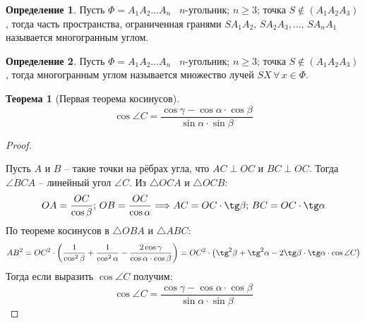 \documentclass[12pt]{article}
\theoremstyle{definition}
\newtheorem{theorem}{Теорема}[section]
\newtheorem{definition}{Определение}
\begin{document}
\begin{definition}
    Пусть $\Phi=A_1A_2\ldots A_n$ \textemdash\, $n$-угольник; $n\geq3$; точка $S\notin (A_1A_2A_3)$, тогда часть пространства, ограниченная гранями $SA_1A_2,\,SA_2A_3,\ldots,\,SA_nA_1$ называется многогранным углом. 
\end{definition}
\begin{definition}
    Пусть $\Phi=A_1A_2\ldots A_n$ \textemdash\, $n$-угольник; $n\geq3$; точка $S\notin (A_1A_2A_3)$, тогда многогранным углом называется множество лучей $SX\,\forall\,x\in\Phi$.
\end{definition}
\begin{theorem}[Первая теорема косинусов]
    $$\cos\angle C=\frac{\cos\gamma-\cos\alpha\cdot\cos\beta}{\sin\alpha\cdot\sin\beta}$$
\end{theorem}
\begin{proof}
    $ $\par\nobreak\ignorespaces
    \begin{center}
    \end{center}
    Пусть $A$ и $B$ – такие точки на рёбрах угла, что $AC\perp OC$ и $BC\perp OC$. Тогда $\angle BCA$ – линейный угол $\angle C$. Из $\triangle OCA$ и $\triangle OCB$:
    $$OA=\frac{OC}{\cos\beta};\,OB=\frac{OC}{\cos\alpha}\Longrightarrow AC=OC\cdot\tg \beta;\,BC=OC\cdot\tg \alpha$$
    По теореме косинусов в $\triangle OBA$ и $\triangle ABC$:
    $$AB^2=OC^2\cdot\left(\frac{1}{\cos^2\beta}+\frac{1}{\cos^2\alpha}-\frac{2\cos\gamma}{\cos\alpha\cdot\cos\beta}\right)=OC^2\cdot\left(\tg^2 \beta+\tg^2 \alpha -2\tg \beta \cdot \tg \alpha \cdot\cos \angle C\right)$$
    Тогда если выразить $\cos\angle C$ получим:
    $$\cos\angle C=\frac{\cos\gamma-\cos\alpha\cdot\cos\beta}{\sin\alpha\cdot\sin\beta}$$
\end{proof}
\end{document}
